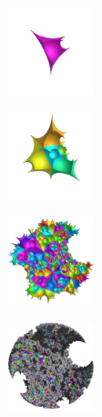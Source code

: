\documentclass[suppldata, dvipdfmx]{interact}
\theoremstyle{plain}%
\theoremstyle{definition}
\theoremstyle{remark}
\theoremstyle{problemstyle}
\begin{document}
\begin{figure}[H]
 \begin{minipage}[t]{0.18\textwidth}
  \centering
  \includegraphics[width=1in, height=1in, keepaspectratio]{./img/constructFractal/finiteProcess/step1.jpg}
  \label{fig:sphaira-step1}
 \end{minipage}
 \hspace*{\fill}
 \begin{minipage}[t]{0.18\textwidth}
  \centering
  \includegraphics[width=1in, height=1in, keepaspectratio]{./img/constructFractal/finiteProcess/step2.jpg}
  \label{fig:sphaira-step2}
 \end{minipage}
 \hspace*{\fill}
 \begin{minipage}[t]{0.18\textwidth}
  \centering
  \includegraphics[width=1in, height=1in, keepaspectratio]{./img/constructFractal/finiteProcess/step5.jpg}
  \label{fig:sphaira-step5}
 \end{minipage}
 \hspace*{\fill}
 \begin{minipage}[t]{0.18\textwidth}
  \centering
  \includegraphics[width=1in, height=1in, keepaspectratio]{./img/constructFractal/finiteProcess/step10.jpg}
  \label{fig:sphaira-step10}
 \end{minipage}

\end{figure}
\end{document}
